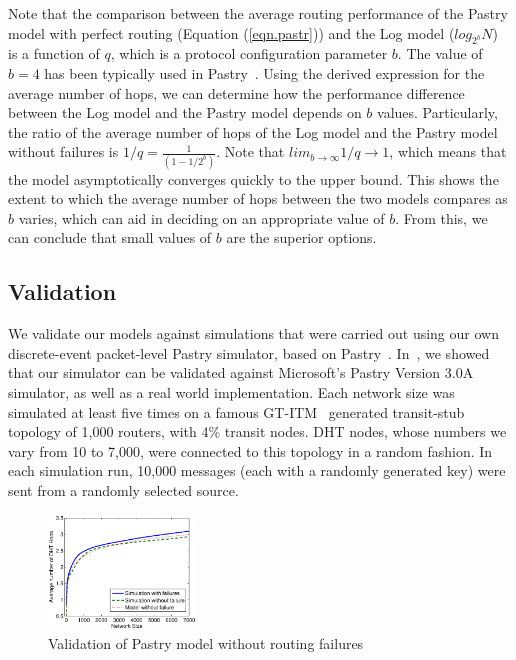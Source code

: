\documentclass[10pt,twocolumn]{article}
\begin{document}
Note that the comparison between the average routing performance of
the Pastry model with perfect routing (Equation (\ref{eqn.pastr}))
and the Log model ($log_{2^b} N$) is a function of $q$, which is a
protocol configuration parameter $b$. The value of $b=4$ has been
typically used in Pastry~\cite{Rowstron01Pastry}. Using the derived
expression for the average number of hops, we can determine  how the
performance difference between the Log model and the Pastry model
depends on $b$ values. Particularly, the ratio of the average number
of hops of the Log model and the Pastry model without failures is
$1/q = \frac{1}{(1-1/2^b)}$. Note that  $lim_{b\rightarrow \infty}
1/q \rightarrow 1$, which means that the model asymptotically
converges quickly to the upper bound. This shows the extent to which
the average number of hops between the two models compares as $b$
varies, which can aid in deciding on an appropriate value of $b$.
From this, we can conclude that small values of $b$ are the superior
options.

\subsection{Validation}
We validate our  models against simulations that were carried out
using our own discrete-event packet-level Pastry simulator, based on
Pastry~\cite{Rowstron01Pastry}. In~\cite{Brampton06Stealth}, we
showed that our simulator can be  validated  against Microsoft's
Pastry Version 3.0A simulator, as well as a real world
implementation. Each network size was simulated at least five times
on a famous GT-ITM~\cite{Calvert97Modeling} generated transit-stub
topology of 1,000 routers, with 4\% transit nodes. DHT nodes, whose
numbers we vary from 10 to 7,000, were connected to this topology in
a random fashion. In each simulation run, 10,000 messages (each with
a randomly generated key) were sent from a randomly selected source.

\begin{figure}[tb] \centering
     {\includegraphics[width=0.35\textwidth]{val_past1.eps}
     \caption{Validation of Pastry model without routing failures}
     \label{fig.valid1}}
\end{figure}
\end{document}
